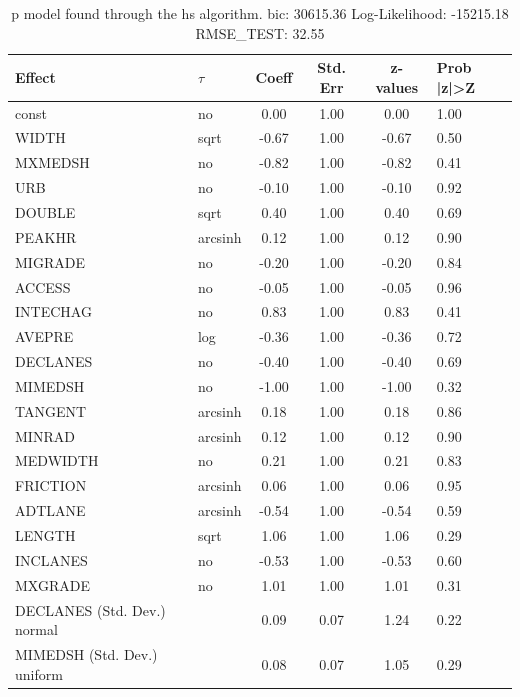 \begin{table}
	\caption{p model found through the hs algorithm. bic: 30615.36 Log-Likelihood: -15215.18 RMSE_TEST: 32.55}
	\begin{center}
		\begin{tabular}{|l|l|c|c|c|l|}
			\hline
			Effect & $\tau$ & Coeff & Std. Err & z-values & Prob |z|>Z \\
			\hline
			const & no & 0.00 & 1.00 & 0.00 & 1.00 \\
			\hline
			WIDTH & sqrt & -0.67 & 1.00 & -0.67 & 0.50 \\
			\hline
			MXMEDSH & no & -0.82 & 1.00 & -0.82 & 0.41 \\
			\hline
			URB & no & -0.10 & 1.00 & -0.10 & 0.92 \\
			\hline
			DOUBLE & sqrt & 0.40 & 1.00 & 0.40 & 0.69 \\
			\hline
			PEAKHR & arcsinh & 0.12 & 1.00 & 0.12 & 0.90 \\
			\hline
			MIGRADE & no & -0.20 & 1.00 & -0.20 & 0.84 \\
			\hline
			ACCESS & no & -0.05 & 1.00 & -0.05 & 0.96 \\
			\hline
			INTECHAG & no & 0.83 & 1.00 & 0.83 & 0.41 \\
			\hline
			AVEPRE & log & -0.36 & 1.00 & -0.36 & 0.72 \\
			\hline
			DECLANES & no & -0.40 & 1.00 & -0.40 & 0.69 \\
			\hline
			MIMEDSH & no & -1.00 & 1.00 & -1.00 & 0.32 \\
			\hline
			TANGENT & arcsinh & 0.18 & 1.00 & 0.18 & 0.86 \\
			\hline
			MINRAD & arcsinh & 0.12 & 1.00 & 0.12 & 0.90 \\
			\hline
			MEDWIDTH & no & 0.21 & 1.00 & 0.21 & 0.83 \\
			\hline
			FRICTION & arcsinh & 0.06 & 1.00 & 0.06 & 0.95 \\
			\hline
			ADTLANE & arcsinh & -0.54 & 1.00 & -0.54 & 0.59 \\
			\hline
			LENGTH & sqrt & 1.06 & 1.00 & 1.06 & 0.29 \\
			\hline
			INCLANES & no & -0.53 & 1.00 & -0.53 & 0.60 \\
			\hline
			MXGRADE & no & 1.01 & 1.00 & 1.01 & 0.31 \\
			\hline
			DECLANES (Std. Dev.) normal &  & 0.09 & 0.07 & 1.24 & 0.22 \\
			\hline
			MIMEDSH (Std. Dev.) uniform &  & 0.08 & 0.07 & 1.05 & 0.29 \\

\end{tabular}
\end{center}
\end{table}
